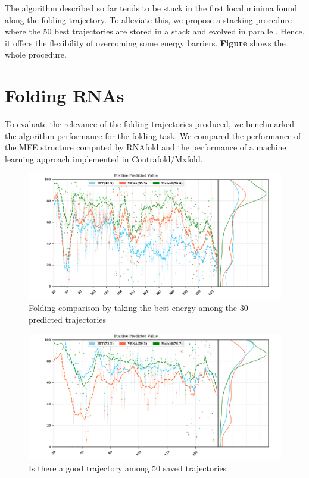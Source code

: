 \documentclass[a4paper,12pt]{article}
\begin{document}
{{The algorithm described so far tends to be stuck in the first local minima found
along the folding trajectory. To alleviate this, we propose a stacking procedure
where the 50 best trajectories are stored in a stack and evolved in parallel.
Hence, it offers the flexibility of overcoming some energy barriers. \textbf{Figure}
shows the whole procedure.

\clearpage
\section{Folding RNAs}
\label{sec:org5499fc4}
To evaluate the relevance of the folding trajectories produced, we benchmarked
the algorithm performance for the folding task. We compared the performance of
the MFE structure computed by RNAfold and the performance of a machine learning
approach implemented in Contrafold/Mxfold.

\begin{figure}[htbp]
\centering
\includegraphics[width=.9\linewidth]{img/comp_100n_30s_pvv.png}
\caption{Folding comparison by taking the best energy among the 30 predicted trajectories}
\end{figure}

\begin{figure}[htbp]
\centering
\includegraphics[width=.9\linewidth]{img/comp_max_50n_50_stacks.png}
\caption{Is there a good trajectory among 50 saved trajectories}
\end{figure}

}}
\end{document}
